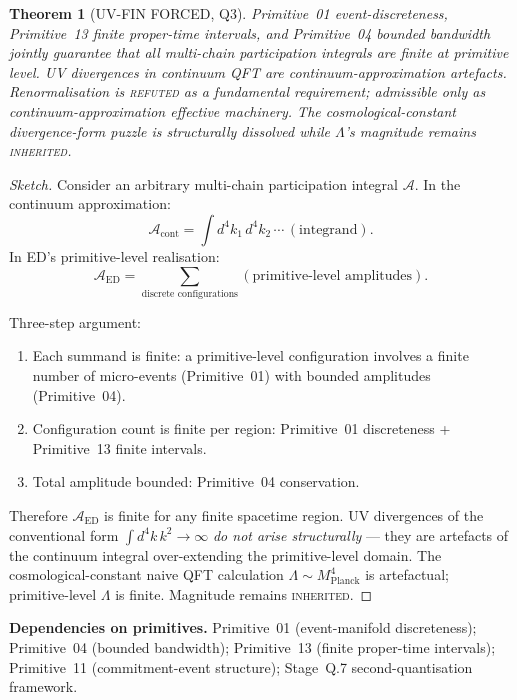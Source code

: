 \documentclass[11pt,a4paper]{article}
\newtheorem{theorem}{Theorem}[section]
\begin{document}
\begin{theorem}[UV-FIN FORCED, Q3]
Primitive~01 event-discreteness, Primitive~13 finite proper-time intervals, and Primitive~04 bounded bandwidth jointly guarantee that all multi-chain participation integrals are finite at primitive level. UV divergences in continuum QFT are continuum-approximation artefacts. Renormalisation is \textsc{refuted} as a fundamental requirement; admissible only as continuum-approximation effective machinery. The cosmological-constant divergence-form puzzle is structurally dissolved while $\Lambda$'s magnitude remains \textsc{inherited}.
\end{theorem}

\begin{proof}[Sketch]
Consider an arbitrary multi-chain participation integral $\mathcal{A}$. In the continuum approximation:
\begin{equation}
\mathcal{A}_\mathrm{cont} = \int d^4 k_1\, d^4 k_2\, \cdots\, (\text{integrand}).
\end{equation}
In ED's primitive-level realisation:
\begin{equation}
\mathcal{A}_\mathrm{ED} = \sum_{\text{discrete configurations}} (\text{primitive-level amplitudes}).
\end{equation}

Three-step argument:
\begin{enumerate}
  \item Each summand is finite: a primitive-level configuration involves a finite number of micro-events (Primitive~01) with bounded amplitudes (Primitive~04).
  \item Configuration count is finite per region: Primitive~01 discreteness + Primitive~13 finite intervals.
  \item Total amplitude bounded: Primitive~04 conservation.
\end{enumerate}

Therefore $\mathcal{A}_\mathrm{ED}$ is finite for any finite spacetime region. UV divergences of the conventional form $\int d^4 k\, k^2 \to \infty$ \emph{do not arise structurally} --- they are artefacts of the continuum integral over-extending the primitive-level domain. The cosmological-constant naive QFT calculation $\Lambda \sim M_\mathrm{Planck}^4$ is artefactual; primitive-level $\Lambda$ is finite. Magnitude remains \textsc{inherited}.
\end{proof}

\textbf{Dependencies on primitives.} Primitive~01 (event-manifold discreteness); Primitive~04 (bounded bandwidth); Primitive~13 (finite proper-time intervals); Primitive~11 (commitment-event structure); Stage~Q.7 second-quantisation framework.
\end{document}

